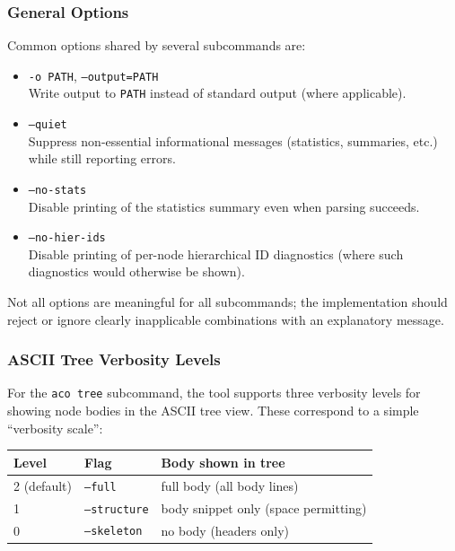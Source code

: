 \documentclass[11pt]{article}
\begin{document}
\subsubsection*{General Options}

Common options shared by several subcommands are:

\begin{itemize}[leftmargin=2em]
  \item \texttt{-o PATH}, \texttt{--output=PATH} \\
        Write output to \texttt{PATH} instead of standard output (where applicable).
  \item \texttt{--quiet} \\
        Suppress non-essential informational messages (statistics, summaries, etc.) while still reporting errors.
  \item \texttt{--no-stats} \\
        Disable printing of the statistics summary even when parsing succeeds.
  \item \texttt{--no-hier-ids} \\
        Disable printing of per-node hierarchical ID diagnostics (where such diagnostics would otherwise be shown).
\end{itemize}

Not all options are meaningful for all subcommands; the implementation should reject or ignore clearly inapplicable combinations with an explanatory message.

\subsubsection*{ASCII Tree Verbosity Levels}

For the \texttt{aco tree} subcommand, the tool supports three verbosity levels for showing node bodies in the ASCII tree view. These correspond to a simple ``verbosity scale'':

\begin{center}
\begin{tabular}{lll}
\hline
\textbf{Level} & \textbf{Flag}        & \textbf{Body shown in tree} \\
\hline
2 (default)    & \texttt{--full}      & full body (all body lines) \\
1              & \texttt{--structure} & body snippet only (space permitting) \\
0              & \texttt{--skeleton}  & no body (headers only) \\
\hline
\end{tabular}
\end{center}
\end{document}
